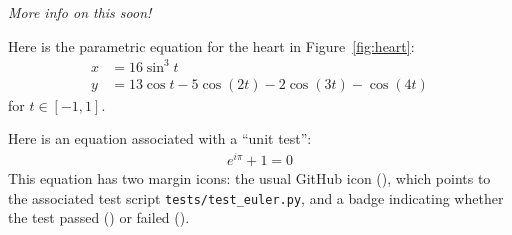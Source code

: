 \documentclass[modern]{aastex62}
\newcommand{\xxx}[1]{\emph{\color{red}#1}}
\begin{document}
\xxx{More info on this soon!}

Here is the parametric equation for the heart in Figure~\ref{fig:heart}:
%
\begin{align}
    \label{eq*:heart}
    x & = 16 \sin^3 t                          \nonumber \\
    y & = 13 \cos t - 5 \cos\left(2 t\right) -
    2 \cos\left(3 t\right) - \cos\left(4 t\right)
\end{align}
%
for $t \in [-1, 1]$.

Here is an equation associated with a ``unit test'':
%
\begin{align}
    \label{eq:euler}
    e^{i\pi} + 1 = 0
\end{align}
%
This equation has two margin icons: the usual GitHub icon (\GitHubIcon), which points to the associated test script \texttt{tests/test\_euler.py}, and a badge indicating whether the test passed
(\TestPassIcon) or failed (\TestFailIcon).

\clearpage

\end{document}
